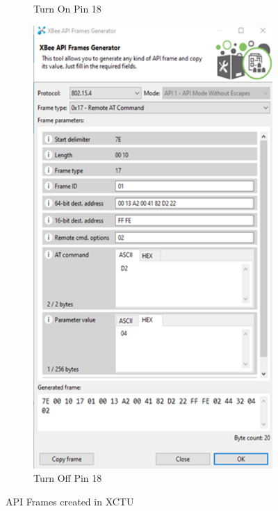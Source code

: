 \begin{figure}[h!]
\begin{subfigure}[t]{0.22\textwidth}
			\caption{Turn On Pin 18}
		\end{subfigure}
		\begin{subfigure}[t]{0.22\textwidth}
			\centering
			\includegraphics[width=\textwidth]{xctuFrames2.png}
			\caption{Turn Off Pin 18}
		\end{subfigure}
		\caption{API Frames created in XCTU}
	\end{figure} 
